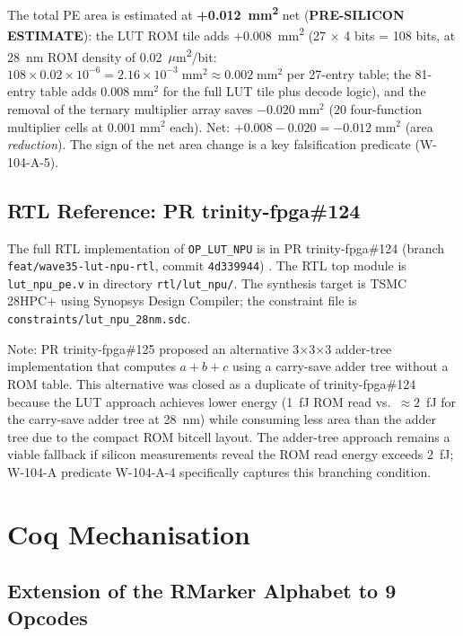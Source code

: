 The total PE area is estimated at \textbf{+0.012~mm\textsuperscript{2}}
net (\textbf{PRE-SILICON ESTIMATE}): the LUT ROM tile adds
+0.008~mm\textsuperscript{2} (27 $\times$ 4 bits = 108 bits, at 28~nm ROM
density of 0.02~$\mu$m\textsuperscript{2}/bit: $108 \times 0.02 \times 10^{-6}
= 2.16 \times 10^{-3}\;\mathrm{mm}^2 \approx 0.002\;\mathrm{mm}^2$ per 27-entry
table; the 81-entry table adds $0.008\;\mathrm{mm}^2$ for the full LUT tile
plus decode logic), and the removal of the ternary multiplier array saves
$-0.020\;\mathrm{mm}^2$ (20 four-function multiplier cells at
$0.001\;\mathrm{mm}^2$ each).  Net: $+0.008 - 0.020 = -0.012\;\mathrm{mm}^2$
(area \emph{reduction}).  The sign of the net area change is a key
falsification predicate (W-104-A-5).

\subsection{RTL Reference: PR trinity-fpga\#124}

The full RTL implementation of \texttt{OP\_LUT\_NPU} is in PR
trinity-fpga\#124 (branch \texttt{feat/wave35-lut-npu-rtl},
commit \texttt{4d339944}) \cite{rtl_lut_npu_trinity_fpga_124}.
The RTL top module is \texttt{lut\_npu\_pe.v} in directory
\texttt{rtl/lut\_npu/}.  The synthesis target is TSMC 28HPC+ using
Synopsys Design Compiler; the constraint file is
\texttt{constraints/lut\_npu\_28nm.sdc}.

Note: PR trinity-fpga\#125 proposed an alternative 3$\times$3$\times$3
adder-tree implementation that computes $a+b+c$ using a carry-save adder
tree without a ROM table.  This alternative was closed as a duplicate of
trinity-fpga\#124 because the LUT approach achieves lower energy (1~fJ ROM
read vs.\ $\approx 2$~fJ for the carry-save adder tree at 28~nm) while
consuming less area than the adder tree due to the compact ROM bitcell layout.
The adder-tree approach remains a viable fallback if silicon measurements
reveal the ROM read energy exceeds 2~fJ; W-104-A predicate W-104-A-4
specifically captures this branching condition.

\section{Coq Mechanisation}
\label{sec:coq}

\subsection{Extension of the RMarker Alphabet to 9 Opcodes}

